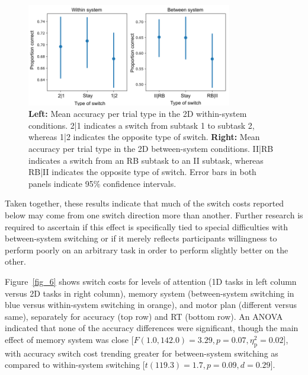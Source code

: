 \documentclass[doc, floatsintext]{apa7}
\begin{document}
%
%

\begin{figure}[h!]
    \centering
    \includegraphics[width=0.8\textwidth]{../figures/fig5.png}
    \caption{
        \textbf{Left:} Mean accuracy per trial type in the 2D
        within-system conditions. 2|1 indicates a switch from
        subtask 1 to subtask 2, whereas 1|2 indicates the
        opposite type of switch.
        \textbf{Right:} Mean accuracy per trial type in the 2D
        between-system conditions. II|RB indicates a switch from
        an RB subtask to an II subtask, whereas RB|II indicates
        the opposite type of switch.
        Error bars in both panels indicate 95\% confidence intervals.
    }
    \label{fig_5}
\end{figure}

Taken together, these results indicate that much of the
switch costs reported below may come from one switch
direction more than another. Further research is required to
ascertain if this effect is specifically tied to special
difficulties with between-system switching or if it merely
reflects participants willingness to perform poorly on an
arbitrary task in order to perform slightly better on the
other.

Figure~\ref{fig_6} shows switch costs for levels of
attention (1D tasks in left column versus 2D tasks in right
column), memory system (between-system switching in blue
versus within-system switching in orange), and motor plan
(different versus same), separately for accuracy (top row)
and RT (bottom row). An ANOVA indicated that none of the
accuracy differences were significant, though the main
effect of memory system was close [$F(1.0, 142.0) = 3.29, p
= 0.07, \eta_{\text{p}}^{2} = 0.02$], with accuracy switch
cost trending greater for between-system switching as
compared to within-system switching [$t(119.3) = 1.7, p =
0.09, d = 0.29$].
\end{document}
